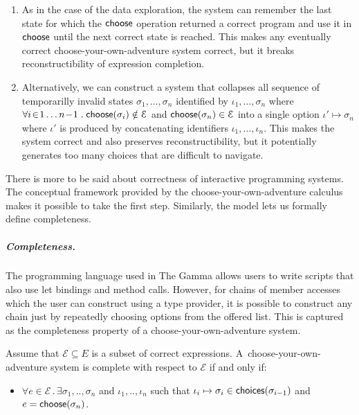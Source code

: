 \documentclass[ a4paper,UKenglish,cleveref, autoref, thm-restate]{lipics-v2021}
\newcommand{\ident}[1]{\textsf{#1}}
\newcommand{\select}{\textnormal{\ident{choose}}}
\newcommand{\choices}{\textnormal{\ident{choices}}}
\begin{document}
\begin{enumerate}
\setlength{\itemsep}{5pt}
\item As in the case of the data exploration, the system can remember the last state for which
  the $\select$ operation returned a correct program and use it in $\select$ until the next correct state is
  reached. This makes any eventually correct choose-your-own-adventure system correct, but it
  breaks reconstructibility of expression completion.

\item Alternatively, we can construct a system that collapses all sequence of temporarilly invalid states
  $\sigma_1, \ldots, \sigma_n$ identified by $\iota_1, \ldots, \sigma_n$ where
  $\forall i\!\in\! 1\ldots n\!-\! 1\;.\;\select(\sigma_i)\notin\mathcal{E}$ and $\select(\sigma_n)\in\mathcal{E}$
  into a single option $\iota' \mapsto \sigma_n$ where $\iota'$ is produced by concatenating
  identifiers $\iota_1,\ldots,\iota_n$.
  This makes the system correct and also preserves reconstructibility, but it potentially
  generates too many choices that are difficult to navigate.
\end{enumerate}

There is more to be said about correctness of interactive programming systems. The
conceptual framework provided by the choose-your-own-adventure calculus makes it possible to
take the first step. Similarly, the model lets us formally define completeness.

\subparagraph{Completeness.}
The programming language used in The Gamma allows users to write scripts that also use let bindings
and method calls. However, for chains of member accesses which the user can construct using
a type provider, it is possible to construct any chain just by repeatedly choosing options from
the offered list. This is captured as the completeness property of a choose-your-own-adventure system.

\begin{definition}[Completeness]
Assume that $\mathcal{E}\subseteq E$ is a subset of correct expressions.
A~choose-your-own-adventure system is complete with respect to $\mathcal{E}$ if and only if:
\begin{itemize}
\item $\forall e\!\in\!\mathcal{E}\,.\,\exists \sigma_1,..,\sigma_n$ and $\iota_1,..,\iota_n$ such that
  $\iota_i\mapsto\sigma_i \in \choices(\sigma_{i-1})$ and $e=\select(\sigma_n)$.
\end{itemize}
\end{definition}
\end{document}
